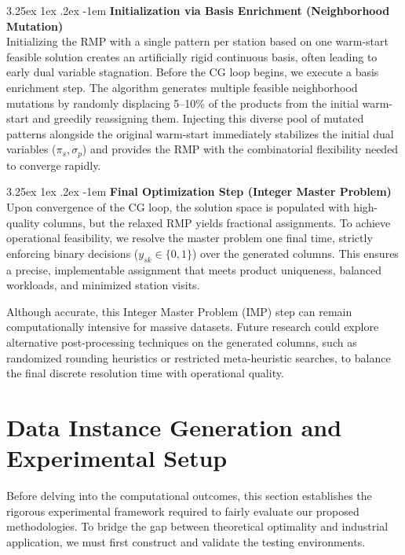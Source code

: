 \documentclass[preprint,review,11pt,authoryear]{elsarticle}
\makeatletter
\renewcommand\paragraph{\@startsection{paragraph}{4}{\z@}
  {3.25ex \@plus1ex \@minus.2ex}
  {-1em}
  {\normalfont\normalsize\itshape}}
\makeatother
\begin{document}
\paragraph{\textbf{Initialization via Basis Enrichment (Neighborhood Mutation) \\}} 
Initializing the RMP with a single pattern per station based on one warm-start feasible solution creates an artificially rigid continuous basis, often leading to early dual variable stagnation. Before the CG loop begins, we execute a basis enrichment step. The algorithm generates multiple feasible neighborhood mutations by randomly displacing 5--10\% of the products from the initial warm-start and greedily reassigning them. Injecting this diverse pool of mutated patterns alongside the original warm-start immediately stabilizes the initial dual variables ($\pi_s, \sigma_p$) and provides the RMP with the combinatorial flexibility needed to converge rapidly.


\paragraph{\textbf{Final Optimization Step (Integer Master Problem) \\}}\label{par:final_optimization_step}
Upon convergence of the CG loop, the solution space is populated with high-quality columns, but the relaxed RMP yields fractional assignments. To achieve operational feasibility, we resolve the master problem one final time, strictly enforcing binary decisions ($y_{sk} \in \{0,1\}$) over the generated columns. This ensures a precise, implementable assignment that meets product uniqueness, balanced workloads, and minimized station visits. 

Although accurate, this Integer Master Problem (IMP) step can remain computationally intensive for massive datasets. Future research could explore alternative post-processing techniques on the generated columns, such as randomized rounding heuristics or restricted meta-heuristic searches, to balance the final discrete resolution time with operational quality.




\section{Data Instance Generation and Experimental Setup}
\label{sec:data_generation}

Before delving into the computational outcomes, this section establishes the rigorous experimental framework required to fairly evaluate our proposed methodologies. To bridge the gap between theoretical optimality and industrial application, we must first construct and validate the testing environments. 
\end{document}
